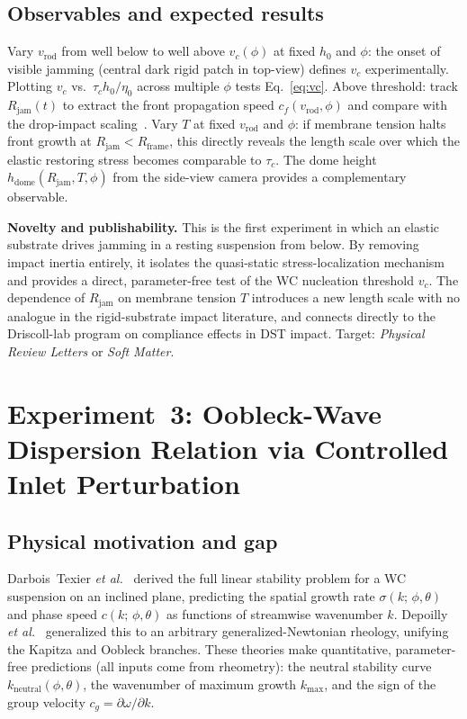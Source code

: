 \documentclass[aps,preprint,superscriptaddress,longbibliography]{revtex4-2}
\newcommand{\tauc}{\tau_c}
\newcommand{\etaz}{\eta_0}
\begin{document}
\subsection{Observables and expected results}

Vary $v_\text{rod}$ from well below to well above $v_c(\phi)$ at fixed $h_0$
and $\phi$: the onset of visible jamming (central dark rigid patch in top-view)
defines $v_c$ experimentally.  Plotting $v_c$ vs.\ $\tauc h_0/\etaz$ across
multiple $\phi$ tests Eq.~\eqref{eq:vc}.  Above threshold: track $R_\text{jam}(t)$
to extract the front propagation speed $c_f(v_\text{rod}, \phi)$ and compare
with the drop-impact scaling~\cite{WaitukaitisJaeger2012}.  Vary $T$ at fixed
$v_\text{rod}$ and $\phi$: if membrane tension halts front growth at
$R_\text{jam} < R_\text{frame}$, this directly reveals the length scale over
which the elastic restoring stress becomes comparable to $\tauc$.  The dome
height $h_\text{dome}(R_\text{jam}, T, \phi)$ from the side-view camera provides
a complementary observable.

\begin{mdframed}[style=noveltybox]
\textbf{Novelty and publishability.}
This is the first experiment in which an elastic substrate drives jamming
in a resting suspension from below.  By removing impact inertia entirely, it
isolates the quasi-static stress-localization mechanism and provides a direct,
parameter-free test of the WC nucleation threshold $v_c$.  The dependence of
$R_\text{jam}$ on membrane tension $T$ introduces a new length scale with no
analogue in the rigid-substrate impact literature, and connects directly to the
Driscoll-lab program on compliance effects in DST impact.  Target:
\textit{Physical Review Letters} or \textit{Soft Matter}.
\end{mdframed}

\section{Experiment~3: Oobleck-Wave Dispersion Relation via Controlled
Inlet Perturbation}
\label{sec:dispersion}

\subsection{Physical motivation and gap}

Darbois~Texier \textit{et al.}~\cite{DarboisTexier2023} derived the full linear
stability problem for a WC suspension on an inclined plane, predicting the
spatial growth rate $\sigma(k;\,\phi,\theta)$ and phase speed $c(k;\,\phi,\theta)$
as functions of streamwise wavenumber $k$.  Depoilly \textit{et al.}\
\cite{Depoilly2024} generalized this to an arbitrary generalized-Newtonian
rheology, unifying the Kapitza and Oobleck branches.  These theories make
quantitative, parameter-free predictions (all inputs come from rheometry): the
neutral stability curve $k_\text{neutral}(\phi,\theta)$, the wavenumber of
maximum growth $k_\text{max}$, and the sign of the group velocity $c_g =
\partial\omega/\partial k$.
\end{document}
